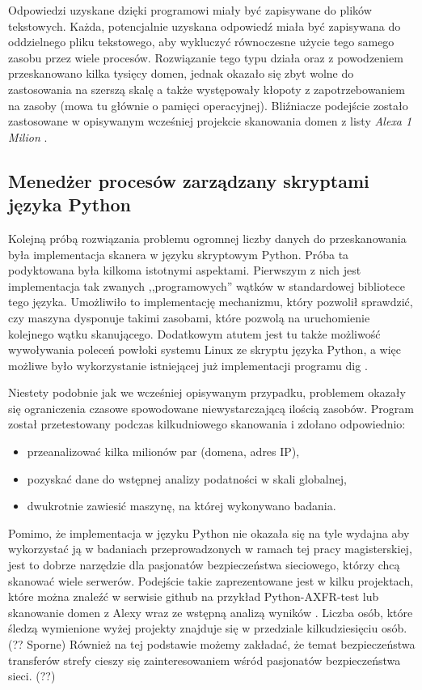 Odpowiedzi uzyskane dzięki programowi miały być zapisywane do plików tekstowych. Każda, potencjalnie uzyskana odpowiedź miała
być zapisywana do oddzielnego pliku tekstowego, aby wykluczyć równoczesne użycie tego samego zasobu przez wiele procesów.
Rozwiązanie tego typu działa oraz z powodzeniem przeskanowano kilka tysięcy domen, jednak okazało się zbyt wolne do zastosowania
na szerszą skalę a także występowały kłopoty z zapotrzebowaniem na zasoby (mowa tu głównie o pamięci operacyjnej). Bliźniacze
podejście zostało zastosowane w opisywanym wcześniej projekcie skanowania domen z listy \textit{Alexa 1 Milion} \cite{scans.io}.

\subsection{Menedżer procesów zarządzany skryptami języka Python}
Kolejną próbą rozwiązania problemu ogromnej liczby danych do przeskanowania była implementacja skanera w języku skryptowym Python.
Próba ta podyktowana była kilkoma istotnymi aspektami. Pierwszym z nich jest implementacja tak zwanych ,,programowych'' wątków w
standardowej bibliotece tego języka. Umożliwiło to implementację mechanizmu, który pozwolił sprawdzić, czy maszyna dysponuje
takimi zasobami, które pozwolą na uruchomienie kolejnego wątku skanującego. Dodatkowym atutem jest tu także możliwość wywoływania
poleceń powłoki systemu Linux ze skryptu języka Python, a więc możliwe było wykorzystanie istniejącej już implementacji programu
dig \cite{isc}.

Niestety podobnie jak we wcześniej opisywanym przypadku, problemem okazały się ograniczenia czasowe spowodowane niewystarczającą
ilością zasobów. Program został przetestowany podczas kilkudniowego skanowania i zdołano odpowiednio:
\begin{itemize}
	\item przeanalizować kilka milionów par (domena, adres IP),
	\item pozyskać dane do wstępnej analizy podatności w skali globalnej,
	\item dwukrotnie zawiesić maszynę, na której wykonywano badania.
\end{itemize}

Pomimo, że implementacja w języku Python nie okazała się na tyle wydajna aby wykorzystać ją w badaniach przeprowadzonych w
ramach tej pracy magisterskiej, jest to dobrze narzędzie dla pasjonatów bezpieczeństwa sieciowego, którzy chcą skanować wiele
serwerów. Podejście takie zaprezentowane jest w kilku projektach, które można znaleźć w serwisie github na przykład
Python-AXFR-test \cite{python_axfr_test} lub skanowanie domen z Alexy wraz ze wstępną analizą wyników \cite{asg-axfr}. Liczba osób,
które śledzą wymienione wyżej projekty znajduje się w przedziale kilkudziesięciu osób. (?? Sporne) Również na tej podstawie możemy zakładać,
że temat bezpieczeństwa transferów strefy cieszy się zainteresowaniem wśród pasjonatów bezpieczeństwa sieci. (??)

